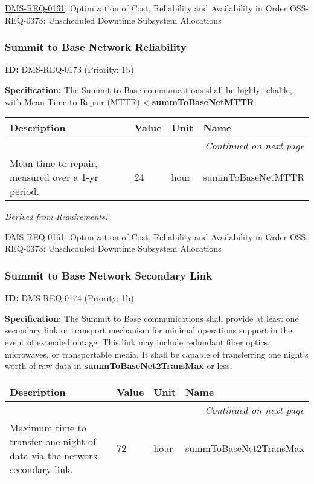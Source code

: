 \documentclass[SE,toc,lsstdraft]{lsstdoc}
\makeatletter
\newcommand{\paramname}[1]{\hspace{0pt}#1}
\newcommand{\unitname}[1]{\hspace{0pt}#1}
\newenvironment{parameters}[0]{%
\setlength\LTleft{0pt}
\setlength\LTright{\fill}
\begin{small}
\begin{longtable}[]{|p{0.49\textwidth}|l|p{0.6in}|p{1.70in}@{}|}

\hline \textbf{Description} & \textbf{Value} & \textbf{Unit} & \textbf{Name} \\ \hline
\endhead

\hline \multicolumn{4}{r}{\emph{Continued on next page}} \\
\endfoot

\hline\hline
\endlastfoot
}{%
\hline
\end{longtable}
\end{small}
}
\makeatother
\begin{document}
\hyperref[DMS-REQ-0161]{DMS-REQ-0161}:
Optimization of Cost, Reliability and Availability in Order \newline
OSS-REQ-0373:
Unscheduled Downtime Subsystem Allocations \newline

\subsubsection{Summit to Base Network Reliability}

\label{DMS-REQ-0173}
\textbf{ID:} DMS-REQ-0173 (Priority: 1b)

\textbf{Specification:} The Summit to Base communications shall be highly reliable, with Mean Time to Repair (MTTR) < \textbf{summToBaseNetMTTR}.

\begin{parameters}
Mean time to repair, measured over a 1-yr period.
&
24
&
\unitname{%
hour
}
&
\paramname{%
summToBaseNetMTTR
} \\\hline
\end{parameters}

\emph{Derived from Requirements:}

\hyperref[DMS-REQ-0161]{DMS-REQ-0161}:
Optimization of Cost, Reliability and Availability in Order \newline
OSS-REQ-0373:
Unscheduled Downtime Subsystem Allocations \newline

\subsubsection{Summit to Base Network Secondary Link}

\label{DMS-REQ-0174}
\textbf{ID:} DMS-REQ-0174 (Priority: 1b)

\textbf{Specification:} The Summit to Base communications shall provide at least one secondary link or transport mechanism for minimal operations support in the event of extended outage.  This link may include redundant fiber optics, microwaves, or transportable media.  It shall be capable of transferring one night's worth of raw data in \textbf{summToBaseNet2TransMax }or less.

\begin{parameters}
Maximum time to transfer one night of data via the network secondary link.
&
72
&
\unitname{%
hour
}
&
\paramname{%
summToBaseNet2TransMax
} \\\hline
\end{parameters}
\end{document}
